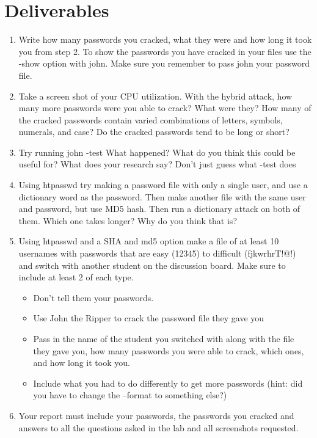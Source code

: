 \documentclass[12pt]{article}
\begin{document}
\section*{Deliverables}
\begin{enumerate}
    \item Write how many passwords you cracked, what they were and how long it took you from step 2. To show the passwords you have cracked in your files use the -show option with john.  Make sure you remember to pass john your password file. 
    \item Take a screen shot of your CPU utilization. With the hybrid attack, how many more passwords were you able to crack? What were they? How many of the cracked passwords contain varied combinations of letters, symbols, numerals, and case? Do the cracked passwords tend to be long or short? 
    \item Try running john -test What happened? What do you think this could be useful for?  What does your research say? Don't just guess what -test does
    \item  Using htpasswd try making a password file with only a single user, and use a dictionary word as the password.  Then make another file with the same user and password, but use MD5 hash. Then run a dictionary attack on both of them. Which one takes longer? Why do you think that is?
    \item Using htpasswd and a SHA and md5 option make a file of at least 10 usernames with passwords that are easy (12345) to difficult  (fjkwrhrT!@!) and switch with another student on the discussion board. Make sure to include at least 2 of each type.  
    \begin{itemize}
        \item Don't tell them your passwords.
        \item  Use John the Ripper to crack the password file they gave you
        \item Pass in the name of the student you switched with along with the file they gave you, how many passwords you were able to crack, which ones, and how long it took you.
        \item Include what you had to do differently to get more passwords (hint: did you have to change the --format to something else?)
    \end{itemize}
    \item Your report must include your passwords, the passwords you cracked and answers to all the questions asked in the lab and all screenshots requested.
\end{enumerate}
\end{document}
